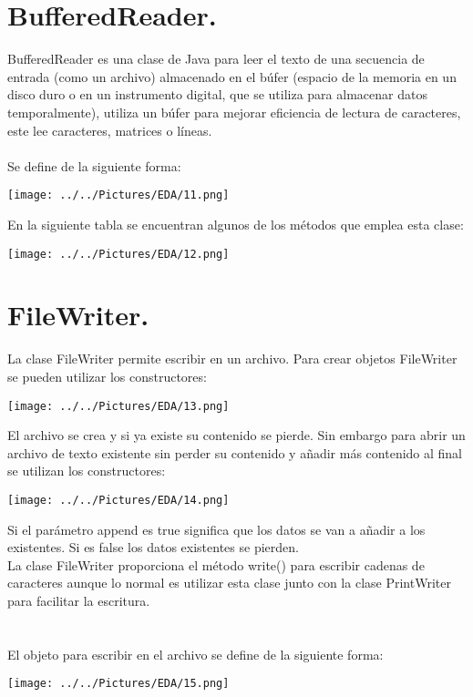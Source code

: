 \documentclass[12pt,letterpaper]{report}
\begin{document}
\section*{BufferedReader.}
BufferedReader es una clase de Java para leer el texto de una secuencia de entrada (como un archivo) almacenado en el búfer (espacio de la memoria en un disco duro o en un instrumento digital, que se utiliza para almacenar datos temporalmente), utiliza un búfer para mejorar eficiencia de lectura de caracteres, este lee caracteres, matrices o líneas.\\\\
Se define de la siguiente forma:\\
\begin{center}
\texttt{[image: ../../Pictures/EDA/11.png]} 
\end{center}
\clearpage
En la siguiente tabla se encuentran algunos de los métodos que emplea esta clase:
\begin{center}
\texttt{[image: ../../Pictures/EDA/12.png]} 
\end{center}
\section*{FileWriter.}
La clase FileWriter permite escribir en un archivo. Para crear objetos FileWriter se pueden utilizar los constructores:
\begin{center}
\texttt{[image: ../../Pictures/EDA/13.png]} 
\end{center}
El archivo se crea y si ya existe su contenido se pierde. Sin embargo para abrir un archivo de texto existente sin perder su contenido y añadir más contenido al final se utilizan los constructores:
\begin{center}
\texttt{[image: ../../Pictures/EDA/14.png]} 
\end{center}
Si el parámetro append es true significa que los datos se van a añadir a los existentes. Si es false los datos existentes se pierden.\\
La clase FileWriter proporciona el método write() para escribir cadenas de caracteres aunque lo normal es utilizar esta clase junto con la clase PrintWriter para facilitar la escritura.\\\\\\
El objeto para escribir en el archivo se define de la siguiente forma:
\begin{center}
\texttt{[image: ../../Pictures/EDA/15.png]} 
\end{center}
\end{document}
